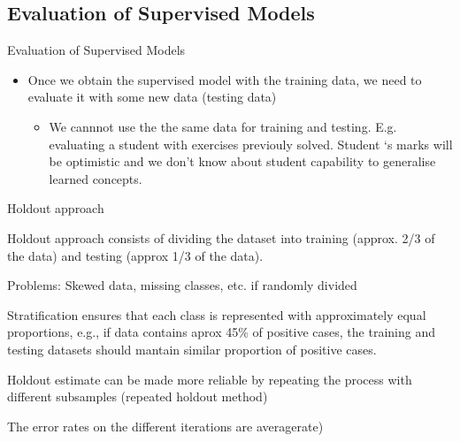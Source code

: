 \documentclass{beamer}
\begin{document}

\subsection{Evaluation of Supervised Models}

\begin{frame}{Evaluation of Supervised Models}



\begin{itemize}
 \item Once we obtain the supervised model with the training data, we need to evaluate it with some new data (testing data)
 
 \begin{itemize}
  \item We cannnot use the the same data for training and testing. E.g. evaluating a student with exercises previouly solved. Student ‘s marks will be optimistic and we don’t know about student capability to generalise learned concepts.
 \end{itemize}

\end{itemize}


\end{frame}


\begin{frame}{Holdout approach}


\alert{Holdout approach} consists of dividing the dataset into training (approx. 2/3 of the data) and testing (approx 1/3 of the data).

Problems: Skewed data, missing classes, etc. if randomly divided

\alert{Stratification} ensures that each class is represented with approximately equal proportions, e.g., if data contains aprox 45\% of positive cases, the training and testing datasets should mantain similar proportion of positive cases. 

Holdout estimate can be made more reliable by repeating the process with different subsamples (\alert{repeated holdout method})

The error rates on the different iterations are averagerate)
\end{frame}
\end{document}
